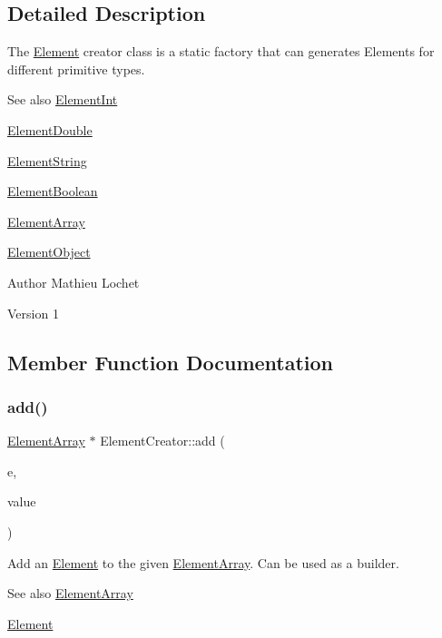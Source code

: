 \subsection{Detailed Description}
The \mbox{\hyperlink{classElement}{Element}} creator class is a static factory that can generates Elements for different primitive types. \begin{DoxySeeAlso}{See also}
\mbox{\hyperlink{classElementInt}{Element\+Int}} 

\mbox{\hyperlink{classElementDouble}{Element\+Double}} 

\mbox{\hyperlink{classElementString}{Element\+String}} 

\mbox{\hyperlink{classElementBoolean}{Element\+Boolean}} 

\mbox{\hyperlink{classElementArray}{Element\+Array}} 

\mbox{\hyperlink{classElementObject}{Element\+Object}}
\end{DoxySeeAlso}
\begin{DoxyAuthor}{Author}
Mathieu Lochet 
\end{DoxyAuthor}
\begin{DoxyVersion}{Version}
1 
\end{DoxyVersion}


\subsection{Member Function Documentation}
\mbox{\label{classElementCreator_a2e31122026b0cbc70196b5c299c33816}} 
\subsubsection{\texorpdfstring{add()}{add()}}
{\footnotesize\ttfamily \mbox{\hyperlink{classElementArray}{Element\+Array}} $\ast$ Element\+Creator\+::add (\begin{DoxyParamCaption}\item[{\mbox{\hyperlink{classElementArray}{Element\+Array}} $\ast$}]{e,  }\item[{\mbox{\hyperlink{classElement}{Element}} $\ast$}]{value }\end{DoxyParamCaption})\hspace{0.3cm}{\ttfamily [static]}}

Add an \mbox{\hyperlink{classElement}{Element}} to the given \mbox{\hyperlink{classElementArray}{Element\+Array}}. Can be used as a builder. \begin{DoxySeeAlso}{See also}
\mbox{\hyperlink{classElementArray}{Element\+Array}} 

\mbox{\hyperlink{classElement}{Element}}
\end{DoxySeeAlso}

